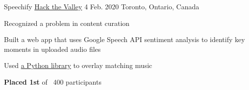 \begin{cventries}
  \cventry
    {Speechify} %
    {\href{https://hackthevalley.io/}{Hack the Valley} 4} %
    {Feb. 2020} %
    {Toronto, Ontario, Canada} %
    {
      \begin{cvitems} %
        \item{Recognized a problem in content curation}
        \item{Built a web app that uses Google Speech API sentiment analysis to identify key moments in uploaded audio files}
        \item{Used \href{https://pypi.org/project/pydub/}{a Python library} to overlay matching music}
        \item {\textbf{Placed 1st}  of ~400 participants}
      \end{cvitems}
    }

\end{cventries}
